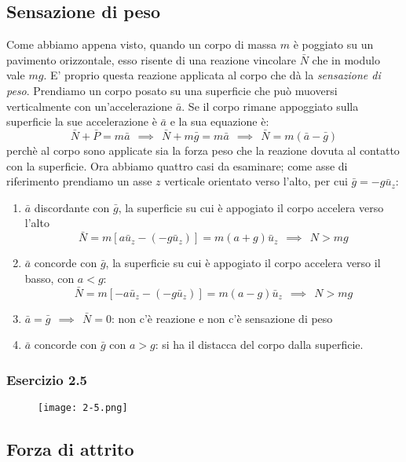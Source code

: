 \documentclass[../../main.tex]{subfiles}
\begin{document}
\subsection{Sensazione di peso}
Come abbiamo appena visto, quando un corpo di massa $m$ è poggiato su un pavimento orizzontale, esso risente di una reazione vincolare $\bar N$ che in modulo vale $mg$. E' proprio questa reazione applicata al corpo che dà la \textit{sensazione di peso}. Prendiamo un corpo posato su una superficie che può muoversi verticalmente con un'accelerazione $\bar a$. Se il corpo rimane appoggiato sulla superficie la sue accelerazione è $\bar a$ e la sua equazione è:
\[
    \bar N + \bar P = m\bar a \ \ \implies \ \ \bar N + m\bar g = m\bar a \ \ \implies \ \ \bar N = m(\bar a - \bar g)
\]
perchè al corpo sono applicate sia la forza peso che la reazione dovuta al contatto con la superficie. Ora abbiamo quattro casi da esaminare; come asse di riferimento prendiamo un asse $z$ verticale orientato verso l'alto, per cui $\bar g = -g\bar u_z$:
\begin{enumerate}
    \item $\bar a$ discordante con $\bar g$, la superficie su cui è appogiato il corpo accelera verso l'alto
          \[
              \bar N = m[a\bar u_z - (-g\bar u_z)] = m(a + g)\bar u_z \ \ \implies \ \ N > mg
          \]
    \item $\bar a$ concorde con $\bar g$, la superficie su cui è appogiato il corpo accelera verso il basso, con $a < g$:
          \[
              \bar N = m[-a\bar u_z - (-g\bar u_z)] = m(a - g)\bar u_z \ \ \implies \ \ N > mg
          \]
    \item $\bar a = \bar g \ \ \implies \ \ \bar N = 0$: non c'è reazione e non c'è sensazione di peso
    \item $\bar a$ concorde con $\bar g$ con $a > g$: si ha il distacca del corpo dalla superficie.
\end{enumerate}
\subsubsection{Esercizio 2.5}
\begin{figure}[H]
    \centering
    \texttt{[image: 2-5.png]}
\end{figure}
\subsection{Forza di attrito}
\end{document}

